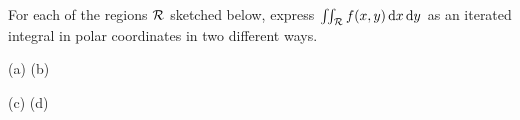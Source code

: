 \begin{question}
For each of the regions $\mathcal{R}$ sketched below, express 
$\iint_{\mathcal{R}} f(x,y)\,\mathrm{d}x\,\mathrm{d}y$ as an iterated integral in polar 
coordinates in two different ways.
\begin{center}
    (a)\quad {}\hfil
    (b)\quad {}
\end{center}
\begin{center}
    (c)\quad {}
                                                      \phantom{$y=x$}\hfil
    (d)\quad {}
\end{center}
\end{question}

